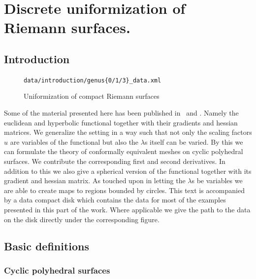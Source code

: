 \documentclass[Thesis.tex]{subfiles}
\begin{document}
\chapter{Discrete uniformization of Riemann surfaces.}

\section{Introduction}

\begin{figure}
\centering
{}
{\scriptsize\tt data/introduction/genus\{0/1/3\}\_data.xml} 
\caption{Uniformization of compact Riemann surfaces}
\label{fig:intro_uniformization}
\end{figure}

Some of the material presented here has been published in~\cite{Bobenko2010} and \cite{Springborn2008}. 
Namely the euclidean and hyperbolic functional together with their gradients and hessian matrices. 
We generalize the setting in a way such that not only the scaling factors $u$ are variables of the functional but also the $\lambda$s itself can be varied. By this we can formulate the theory of conformally equivalent meshes on cyclic polyhedral surfaces.
We contribute the corresponding first and second derivatives. 
In addition to this we also give a spherical version of the functional together with its gradient and hessian matrix. 
As touched upon in \cite{Bobenko2010} letting the $\lambda$s be variables we are able to create maps to regions bounded by circles.
This text is accompanied by a data compact disk which contains the data for most of the examples presented in this part of the work. 
Where applicable we give the path to the data on the disk directly under the corresponding figure.

\section{Basic definitions}

\subsection{Cyclic polyhedral surfaces }
\end{document}
